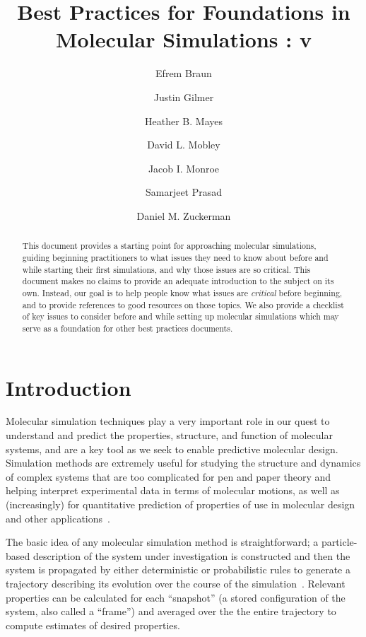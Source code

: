 \documentclass[9pt,bestpractices]{livecoms}
\title{Best Practices for Foundations in Molecular Simulations : v\versionnumber}
\author[1]{Efrem Braun}
\author[2]{Justin Gilmer}
\author[3]{Heather B. Mayes}
\author[4]{David L. Mobley}
\author[5]{Jacob I. Monroe}
\author[6]{Samarjeet Prasad}
\author[7]{Daniel M. Zuckerman}
\affil[1]{University of California, Berkeley}
\affil[2]{Vanderbilt University}
\affil[3]{University of Michigan, Ann Arbor}
\affil[4]{University of California, Irvine}
\affil[5]{University of California, Santa Barbara}
\affil[6]{National Institutes of Health}
\affil[7]{Oregon Health and Science University}
\begin{document}
\begin{frontmatter}
\maketitle

\begin{abstract}
This document provides a starting point for approaching molecular simulations, guiding beginning practitioners to what issues they need to know about before and while starting their first simulations, and why those issues are so critical. 
This document makes no claims to provide an adequate introduction to the subject on its own. 
Instead, our goal is to help people know what issues are \emph{critical} before beginning, and to provide references to good resources on those topics. 
We also provide a checklist of key issues to consider before and while setting up molecular simulations which may serve as a foundation for other best practices documents.
\end{abstract}
\end{frontmatter}


\todototoc
\listoftodos

\section{Introduction}
\label{sec:intro}

Molecular simulation techniques play a very important role in our quest to understand and predict the properties, structure, and function of molecular systems, and are a key tool as we seek to enable predictive molecular design.
Simulation methods are extremely useful for studying the structure and dynamics of complex systems that are too complicated for pen and paper theory and helping interpret experimental data in terms of molecular motions, as well as (increasingly) for quantitative prediction of properties of use in molecular design and other applications~\cite{Nussinov2014,Towns2014,Kirchmair2015,Sresht2017,Bottaro2018}.

The basic idea of any molecular simulation method is straightforward; a particle-based description of the system under investigation is constructed and then the system is propagated by either deterministic or probabilistic rules to generate a trajectory describing its evolution over the course of the simulation~\cite{Frenkel:2001:,LeachBook}.
Relevant properties can be calculated for each ``snapshot'' (a stored configuration of the system, also called a ``frame'') and averaged over the the entire trajectory to compute estimates of desired properties.
\end{document}
